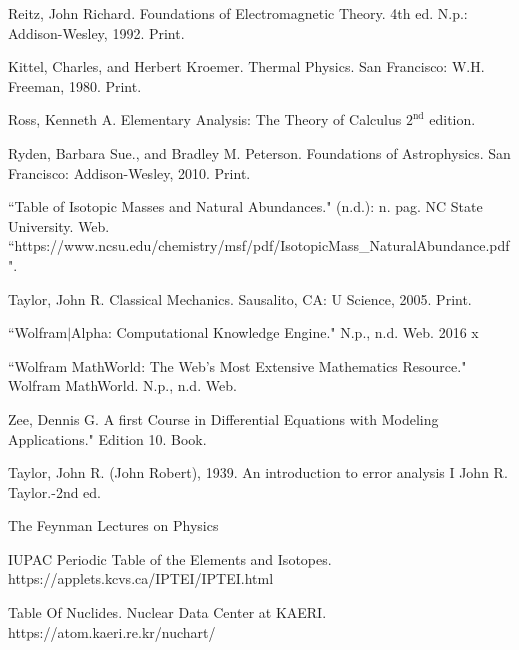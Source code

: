 {\begin{thebibliography}{99}
	
	 Reitz, John Richard. Foundations of Electromagnetic Theory. 4th ed. N.p.: Addison-Wesley, 1992. Print. 
	
	  Kittel, Charles, and Herbert Kroemer. Thermal Physics. San Francisco: W.H. Freeman, 1980. Print.
	
	
	 Ross, Kenneth A. Elementary Analysis: The Theory of Calculus $2^{\textrm{nd}}$ edition. 
	
	 Ryden, Barbara Sue., and Bradley M. Peterson. Foundations of Astrophysics. San Francisco: Addison-Wesley, 2010. Print. 
	
	 ``Table of Isotopic Masses and Natural Abundances." (n.d.): n. pag. NC State University. Web. ``https://www.ncsu.edu/chemistry/msf/pdf/IsotopicMass\_NaturalAbundance.pdf". 
	
	 Taylor, John R. Classical Mechanics. Sausalito, CA: U Science, 2005. Print. 
	
	 ``Wolfram$|$Alpha: Computational Knowledge Engine." N.p., n.d. Web. 2016 x
	
	 ``Wolfram MathWorld: The Web's Most Extensive Mathematics Resource." Wolfram MathWorld. N.p., n.d. Web. 
	
	 Zee, Dennis G. A first Course in Differential Equations with Modeling Applications." Edition 10. Book.
	
	 Taylor, John R. (John Robert), 1939. An introduction to error analysis I John R. Taylor.-2nd ed.
	
	 The Feynman Lectures on Physics

 	 IUPAC Periodic Table of the Elements and Isotopes. https://applets.kcvs.ca/IPTEI/IPTEI.html

  	 Table Of Nuclides.  Nuclear Data Center at KAERI. https://atom.kaeri.re.kr/nuchart/


\end{thebibliography}}
